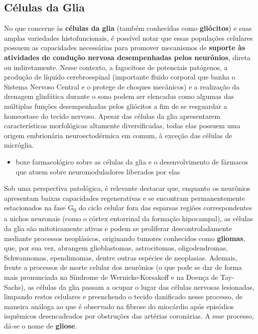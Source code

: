 \documentclass[
]{book}
\providecommand{\tightlist}{%
  \setlength{\itemsep}{0pt}\setlength{\parskip}{0pt}}
\theoremstyle{definition}
\theoremstyle{definition}
\theoremstyle{definition}
\theoremstyle{definition}
\theoremstyle{remark}
\begin{document}
\hypertarget{cuxe9lulas-da-glia}{%
\subsection*{Células da Glia}\label{cuxe9lulas-da-glia}}

No que concerne às \textbf{células da glia} (também conhecidas como \textbf{gliócitos}) e suas amplas variedades histofuncionais, é possível notar que essas populações celulares possuem as capacidades necessárias para promover mecanismos de \textbf{suporte às atividades de condução nervosa desempenhadas pelos neurônios}, direta ou indiretamente. Nesse contexto, a fagocitose de potenciais patógenos, a produção de líquido cerebroespinal (importante fluido corporal que banha o Sistema Nervoso Central e o protege de choques mecânicos) e a realização da drenagem glinfática durante o sono podem ser elencadas como algumas das múltiplas funções desempenhadas pelos gliócitos a fim de se resguardar a homeostase do tecido nervoso. Apesar das células da glia apresentarem características morfológicas altamente diversificadas, todas elas possuem uma origem embrionária neuroectodérmica em comum, à exceção das células de micróglia.

\begin{itemize}
\tightlist
\item
  boxe farmacológico sobre as células da glia e o desenvolvimento de fármacos que atuem sobre neuromoduladores liberados por elas
\end{itemize}

Sob uma perspectiva patológica, é relevante destacar que, enquanto os neurônios apresentam baixas capacidades regenerativas e se encontram permanentemente estacionados na fase G\textsubscript{0} do ciclo celular fora das esparsas regiões correspondentes a nichos neuronais (como o córtex entorrinal da formação hipocampal), as células da glia são mitoticamente ativas e podem se proliferar descontroladamente mediante processos neoplásicos, originando tumores conhecidos como \textbf{gliomas}, que, por sua vez, abrangem glioblastomas, astrocitomas, oligodendromas, Schwannomas, ependimomas, dentre outras espécies de neoplasias. Ademais, frente a processos de morte celular dos neurônios (o que pode se dar de forma mais pronunciada na Síndrome de Wernicke-Korsakoff e na Doença de Tay-Sachs), as células da glia passam a ocupar o lugar das células nervosas lesionadas, limpando restos celulares e preenchendo o tecido danificado nesse processo, de maneira análoga ao que é observado na fibrose do miocárdio após episódios isquêmicos desencadeados por obstruções das artérias coronárias. A esse processo, dá-se o nome de \textbf{gliose}.
\end{document}
